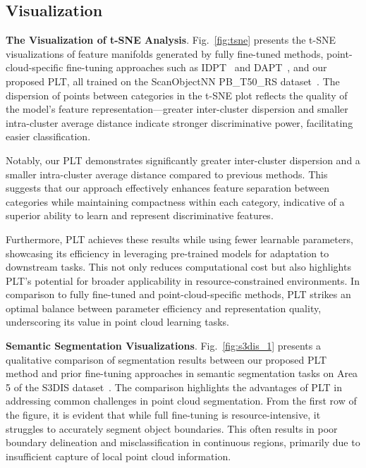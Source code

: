 



\subsection{Visualization}

\textbf{The Visualization of t-SNE Analysis}. Fig.~\ref{fig:tsne} presents the t-SNE~\cite{van2008visualizing} visualizations of feature manifolds generated by fully fine-tuned methods, point-cloud-specific fine-tuning approaches such as IDPT~\cite{zha2023instance} and DAPT~\cite{zhou2024dynamic}, and our proposed PLT, all trained on the ScanObjectNN PB\_T50\_RS dataset~\cite{uy2019revisiting}. The dispersion of points between categories in the t-SNE plot reflects the quality of the model's feature representation—greater inter-cluster dispersion and smaller intra-cluster average distance indicate stronger discriminative power, facilitating easier classification.

Notably, our PLT demonstrates significantly greater inter-cluster dispersion and a smaller intra-cluster average distance compared to previous methods. This suggests that our approach effectively enhances feature separation between categories while maintaining compactness within each category, indicative of a superior ability to learn and represent discriminative features.

Furthermore, PLT achieves these results while using fewer learnable parameters, showcasing its efficiency in leveraging pre-trained models for adaptation to downstream tasks. This not only reduces computational cost but also highlights PLT's potential for broader applicability in resource-constrained environments. In comparison to fully fine-tuned and point-cloud-specific methods, PLT strikes an optimal balance between parameter efficiency and representation quality, underscoring its value in point cloud learning tasks.

\textbf{Semantic Segmentation Visualizations}. Fig.~\ref{fig:s3dis_1} presents a qualitative comparison of segmentation results between our proposed PLT method and prior fine-tuning approaches in semantic segmentation tasks on Area 5 of the S3DIS dataset~\cite{armeni20163d}. The comparison highlights the advantages of PLT in addressing common challenges in point cloud segmentation. From the first row of the figure, it is evident that while full fine-tuning is resource-intensive, it struggles to accurately segment object boundaries. This often results in poor boundary delineation and misclassification in continuous regions, primarily due to insufficient capture of local point cloud information. 

